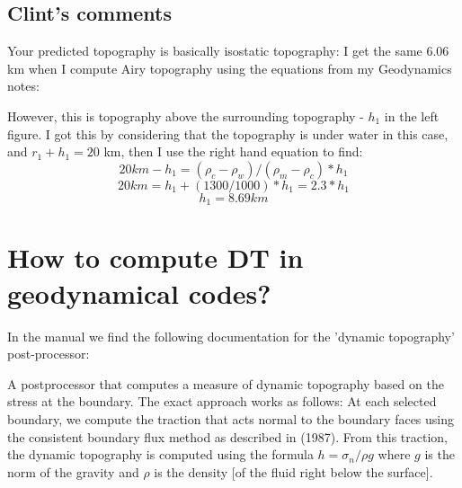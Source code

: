 \subsection*{Clint's comments}

{\color{darkgray} Your predicted topography is basically isostatic topography: 
I get the same 6.06 km when I compute Airy topography using the equations from my Geodynamics notes}:

\begin{center}
\end{center}

{\color{darkgray}
However, this is topography above the surrounding topography - $h_1$ in the left figure.
I got this by considering that the topography is under water in this case, and $r_1+h_1=20$ km, 
then I use the right hand equation to find:
\[
20 km - h_1 = (\rho_c - \rho_w)/(\rho_m - \rho_c) *h_1
\]
\[
20 km = h_1 + (1300/1000) * h_1 = 2.3*h_1
\]
\[
h_1 = 8.69 km
\]
}








\section*{How to compute DT in geodynamical codes?}

\noindent In the \aspect manual we find the following documentation for the 'dynamic topography' post-processor:
\begin{displayquote}
{\color{darkgray}
A postprocessor that computes a measure of dynamic topography based on the stress at the boundary. 
The exact approach works as follows: At each selected boundary, we compute the traction that acts normal to 
the boundary faces using the consistent boundary flux method as described in \textcite{grls87} (1987).
From this traction, the dynamic topography is computed using the formula $h=\sigma_n / \rho g$ where $g$
is the norm of the gravity and $\rho$
is the density [of the fluid right below the surface]. 
}
\end{displayquote}

